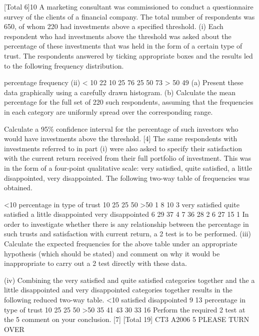 \documentclass[a4paper,12pt]{article}
\begin{document}
\begin{enumerate}
[Total 6]10
A marketing consultant was commissioned to conduct a questionnaire survey of the clients of a financial company. The total number of respondents was 650, of whom 220 had investments above a specified threshold.
(i)
Each respondent who had investments above the threshold was asked about the percentage of these investments that was held in the form of a certain type of trust. The respondents answered by ticking appropriate boxes and the results led to the following frequency distribution.

percentage
frequency
(ii)
< 10
22
10 25
76
25 50
73
> 50
49
(a) Present these data graphically using a carefully drawn histogram.
(b) Calculate the mean percentage for the full set of 220 such respondents, assuming that the frequencies in each category are uniformly spread over the corresponding range.

Calculate a 95\% confidence interval for the percentage of such investors who would have investments above the threshold.
[4]
The same respondents with investments referred to in part (i) were also asked to specify their satisfaction with the current return received from their full portfolio of investment. This was in the form of a four-point qualitative scale: very satisfied, quite satisfied, a little disappointed, very disappointed. The following two-way table of frequencies was obtained.

<10
percentage in type of trust
10 25
25 50
>50
1
8
10
3
very satisfied
quite satisfied
a little disappointed
very disappointed
6
29
37
4
7
36
28
2
6
27
15
1
In order to investigate whether there is any relationship between the percentage in such trusts and satisfaction with current return, a 2 test is to be performed. 
(iii) Calculate the expected frequencies for the above table under an appropriate hypothesis (which should be stated) and comment on why it would be inappropriate to carry out a 2 test directly with these data.

(iv) Combining the very satisfied and quite satisfied categories together and the a little disappointed and very disappointed categories together results in the following reduced two-way table.
<10
satisfied
disappointed
9
13
percentage in type of trust
10 25
25 50
>50
35
41
43
30
33
16
Perform the required 2 test at the 5%
comment on your conclusion.
[7]
[Total 19]
CT3 A2006 5
PLEASE TURN OVER


\end{enumerate}
\end{document}
